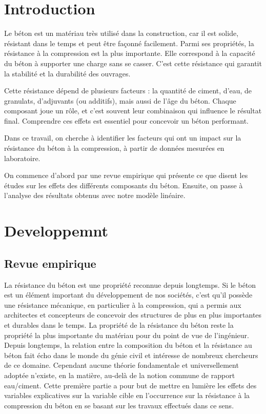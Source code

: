 \documentclass[
  12pt,
]{article}
\title{\fbox{\huge Regression Linéaire}}
\author{Dimitri DELPECH, \and Timothé FADENIPO, \and Matthis
ARVOIS, \and Ismael MADOU GAGI GREMA, \and Cheikh LO}
\date{2025-04-11}
\begin{document}
\maketitle

{
\setcounter{tocdepth}{2}
\tableofcontents
}
\newpage

\section{Introduction}\label{introduction}

Le béton est un matériau très utilisé dans la construction, car il est
solide, résistant dans le temps et peut être façonné facilement. Parmi
ses propriétés, la résistance à la compression est la plus importante.
Elle correspond à la capacité du béton à supporter une charge sans se
casser. C'est cette résistance qui garantit la stabilité et la
durabilité des ouvrages.

Cette résistance dépend de plusieurs facteurs : la quantité de ciment,
d'eau, de granulats, d'adjuvants (ou additifs), mais aussi de l'âge du
béton. Chaque composant joue un rôle, et c'est souvent leur combinaison
qui influence le résultat final. Comprendre ces effets est essentiel
pour concevoir un béton performant.

Dans ce travail, on cherche à identifier les facteurs qui ont un impact
sur la résistance du béton à la compression, à partir de données
mesurées en laboratoire.

On commence d'abord par une revue empirique qui présente ce que disent
les études sur les effets des différents composants du béton. Ensuite,
on passe à l'analyse des résultats obtenus avec notre modèle linéaire.

\section{Developpemnt}\label{developpemnt}

\subsection{Revue empirique}\label{revue-empirique}

La résistance du béton est une propriété reconnue depuis longtemps. Si
le béton est un élément important du développement de nos sociétés,
c'est qu'il possède une résistance mécanique, en particulier à la
compression, qui a permis aux architectes et concepteurs de concevoir
des structures de plus en plus importantes et durables dans le temps. La
propriété de la résistance du béton reste la propriété la plus
importante du matériau pour du point de vue de l'ingénieur. Depuis
longtemps, la relation entre la composition du béton et la résistance au
béton fait écho dans le monde du génie civil et intéresse de nombreux
chercheurs de ce domaine. Cependant aucune théorie fondamentale et
universellement adoptée n'existe, en la matière, au-delà de la notion
commune de rapport eau/ciment. Cette première partie a pour but de
mettre en lumière les effets des variables explicatives sur la variable
cible en l'occurrence sur la résistance à la compression du béton en se
basant sur les travaux effectués dans ce sens.
\end{document}
